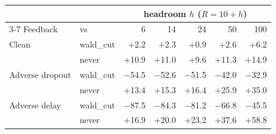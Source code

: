 \begin{tabular}{@{}l l r r r r r @{}}
\toprule
 & & \multicolumn{5}{c}{headroom $h$ ($R=10+h$)} \\
\cmidrule(lr){3-7}
Feedback & vs & 6 & 14 & 24 & 50 & 100 \\
\midrule
Clean & wald\_cut & +2.2 & +2.3 & +0.9 & +2.6 & +6.2 \\
 & never & +10.9 & +11.0 & +9.6 & +11.3 & +14.9 \\
Adverse dropout & wald\_cut & $-$54.5 & $-$52.6 & $-$51.5 & $-$42.0 & $-$32.9 \\
 & never & +13.4 & +15.3 & +16.4 & +25.9 & +35.0 \\
Adverse delay & wald\_cut & $-$87.5 & $-$84.3 & $-$81.2 & $-$66.8 & $-$45.5 \\
 & never & +16.9 & +20.0 & +23.2 & +37.6 & +58.8 \\
\bottomrule
\end{tabular}
